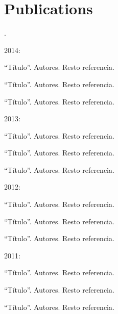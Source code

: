 \chapter{Publications}\label{publications}
{\color{white}.}

\par{\Large{} 2014:}
\begin{miEnumerate}
\item
    ``Título''.
    Autores.
    Resto referencia. 
\item
    ``Título''.
    Autores.
    Resto referencia. 
\item
    ``Título''.
    Autores.
    Resto referencia. 
\end{miEnumerate}
\vspace{1.4cm}

\par{\Large{} 2013:}
\begin{miEnumerate}
\item
    ``Título''.
    Autores.
    Resto referencia. 
\item
    ``Título''.
    Autores.
    Resto referencia. 
\item
    ``Título''.
    Autores.
    Resto referencia. 
\end{miEnumerate}
\vspace{1.4cm}

\par{\Large{} 2012:}
\begin{miEnumerate}
\item
    ``Título''.
    Autores.
    Resto referencia. 
\item
    ``Título''.
    Autores.
    Resto referencia. 
\item
    ``Título''.
    Autores.
    Resto referencia. 
\end{miEnumerate}
\vspace{1.4cm}

\par{\Large{} 2011:}
\begin{miEnumerate}
\item
    ``Título''.
    Autores.
    Resto referencia. 
\item
    ``Título''.
    Autores.
    Resto referencia. 
\item
    ``Título''.
    Autores.
    Resto referencia. 
\end{miEnumerate}
\vspace{1.4cm}



